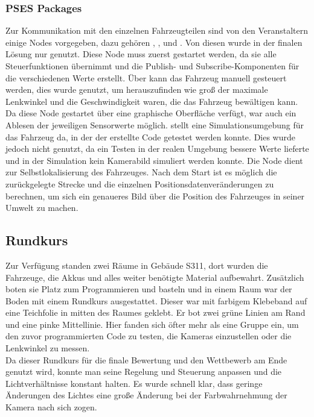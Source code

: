 \subsubsection{PSES Packages}
\label{sec:psespackages}
Zur Kommunikation mit den einzelnen Fahrzeugteilen sind von den Veranstaltern einige Nodes vorgegeben, dazu gehören , ,  und . Von diesen wurde in der finalen Lösung nur  genutzt. Diese Node muss zuerst gestartet werden, da sie alle Steuerfunktionen übernimmt und die Publish- und Subscribe-Komponenten für die verschiedenen Werte erstellt. 
Über  kann das Fahrzeug manuell gesteuert werden, dies wurde genutzt, um herauszufinden wie groß der maximale Lenkwinkel und die Geschwindigkeit waren, die das Fahrzeug bewältigen kann. Da diese Node gestartet über eine graphische Oberfläche verfügt, war auch ein Ablesen der jeweiligen Sensorwerte möglich.  stellt eine Simulationsumgebung für das Fahrzeug da, in der der erstellte Code getestet werden konnte. Dies wurde jedoch nicht genutzt, da ein Testen in der realen Umgebung bessere Werte lieferte und in der Simulation kein Kamerabild simuliert werden konnte. 
Die Node  dient zur Selbstlokalisierung des Fahrzeuges. Nach dem Start ist es möglich die zurückgelegte Strecke und die einzelnen Positionsdatenveränderungen zu berechnen, um sich ein genaueres Bild über die Position des Fahrzeuges in seiner Umwelt zu machen.

\subsection{Rundkurs}
\label{sec:rundkurs}
Zur Verfügung standen zwei Räume in Gebäude S311, dort wurden die Fahrzeuge, die Akkus und alles weiter benötigte Material aufbewahrt. Zusätzlich boten sie Platz zum Programmieren und basteln und in einem Raum war der Boden mit einem Rundkurs ausgestattet. Dieser war mit farbigem Klebeband auf eine Teichfolie in mitten des Raumes geklebt. Er bot zwei grüne Linien am Rand und eine pinke Mittellinie. Hier fanden sich öfter mehr als eine Gruppe ein, um den zuvor programmierten Code zu testen, die Kameras einzustellen oder die Lenkwinkel zu messen. \\
Da dieser Rundkurs für die finale Bewertung und den Wettbewerb am Ende genutzt wird, konnte man seine Regelung und Steuerung anpassen und die Lichtverhältnisse konstant halten. Es wurde schnell klar, dass geringe Änderungen des Lichtes eine große Änderung bei der Farbwahrnehmung der Kamera nach sich zogen. 
